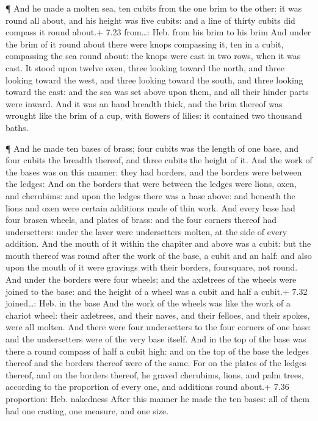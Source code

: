  ¶ And he made a molten sea, ten cubits from the one brim
to the other: it was round all about, and his height was five cubits:
and a line of thirty cubits did compass it round about.+ 7.23
from\ldots: Heb. from his brim to his brim  And under the
brim of it round about there were knops compassing it, ten in a cubit,
compassing the sea round about: the knops were cast in two rows, when it
was cast.  It stood upon twelve oxen, three looking toward
the north, and three looking toward the west, and three looking toward
the south, and three looking toward the east: and the sea was set above
upon them, and all their hinder parts were inward.  And it
was an hand breadth thick, and the brim thereof was wrought like the
brim of a cup, with flowers of lilies: it contained two thousand baths.

 ¶ And he made ten bases of brass; four cubits was the
length of one base, and four cubits the breadth thereof, and three
cubits the height of it.  And the work of the bases was on
this manner: they had borders, and the borders were between the ledges:
 And on the borders that were between the ledges were
lions, oxen, and cherubims: and upon the ledges there was a base above:
and beneath the lions and oxen were certain additions made of thin work.
 And every base had four brasen wheels, and plates of
brass: and the four corners thereof had undersetters: under the laver
were undersetters molten, at the side of every addition. 
And the mouth of it within the chapiter and above was a cubit: but the
mouth thereof was round after the work of the base, a cubit and an half:
and also upon the mouth of it were gravings with their borders,
foursquare, not round.  And under the borders were four
wheels; and the axletrees of the wheels were joined to the base: and the
height of a wheel was a cubit and half a cubit.+ 7.32 joined\ldots: Heb.
in the base  And the work of the wheels was like the work
of a chariot wheel: their axletrees, and their naves, and their felloes,
and their spokes, were all molten.  And there were four
undersetters to the four corners of one base: and the undersetters were
of the very base itself.  And in the top of the base was
there a round compass of half a cubit high: and on the top of the base
the ledges thereof and the borders thereof were of the same.
 For on the plates of the ledges thereof, and on the
borders thereof, he graved cherubims, lions, and palm trees, according
to the proportion of every one, and additions round about.+ 7.36
proportion: Heb. nakedness  After this manner he made the
ten bases: all of them had one casting, one measure, and one size.

